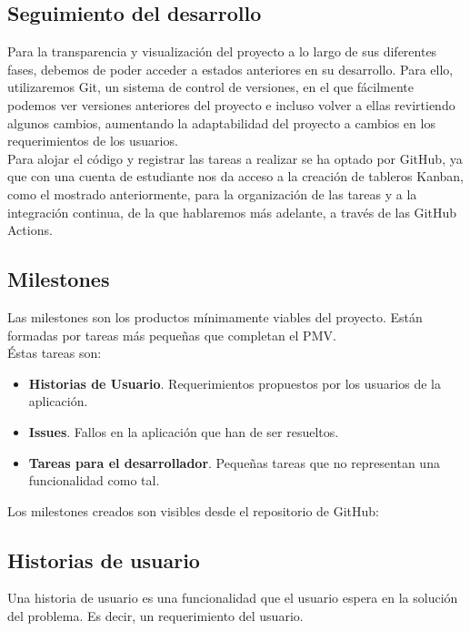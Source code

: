 \subsection{Seguimiento del desarrollo}
Para la transparencia y visualización del proyecto a lo largo de sus diferentes fases, debemos de poder acceder a estados anteriores en su desarrollo. Para ello, utilizaremos Git, un sistema de control de versiones, en el que fácilmente podemos ver versiones anteriores del proyecto e incluso volver a ellas revirtiendo algunos cambios, aumentando la adaptabilidad del proyecto a cambios en los requerimientos de los usuarios.\\

Para alojar el código y registrar las tareas a realizar se ha optado por GitHub, ya que con una cuenta de estudiante nos da acceso a la creación de tableros Kanban, como el mostrado anteriormente, para la organización de las tareas y a la integración continua, de la que hablaremos más adelante, a través de las GitHub Actions.

\subsection{Milestones}
Las milestones son los productos mínimamente viables del proyecto. Están formadas por tareas más pequeñas que completan el PMV.\\

Éstas tareas son:
\begin{itemize}
    \item \textbf{Historias de Usuario}. Requerimientos propuestos por los usuarios de la aplicación.
    \item \textbf{Issues}. Fallos en la aplicación que han de ser resueltos.
    \item \textbf{Tareas para el desarrollador}. Pequeñas tareas que no representan una funcionalidad como tal.
\end{itemize}

Los milestones creados son visibles desde el repositorio de GitHub:

\subsection{Historias de usuario}
Una historia de usuario es una funcionalidad que el usuario espera en la solución del problema. Es decir, un requerimiento del usuario.\\

